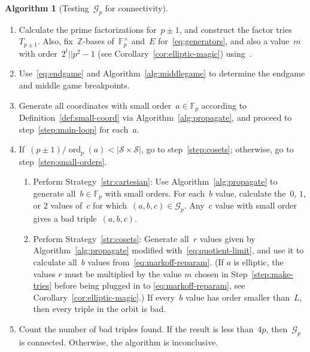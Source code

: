 \documentclass{article}
\DeclareMathOperator{\ord}{ord}
\theoremstyle{definition}
\newtheorem{algorithm-thm}[algocf]{Algorithm}
\theoremstyle{remark}
\begin{document}
\FloatBarrier
\begin{algorithm-thm}[Testing~$\mathcal{G}_p$ for connectivity]\label{alg:process}
    \mbox{}
    \begin{enumerate}[ref=\arabic*]
        \item\label{step:make-tries}
            Calculate the prime factorizations for~$p \pm 1$, and construct the factor tries~$T_{p \pm 1}$.
            Also, fix~$\mathbb{Z}$-bases of~$\mathbb{F}_p^\times$ and~$E$ for~\eqref{eq:generators}, and also a value~$m$ with order~$2^t || p^2 - 1$ (see Corollary~\ref{cor:elliptic-magic}) using~\cite[Algorithm 6.1]{generators}.
        \item\label{step:breakpoints}
            Use~\eqref{eq:endgame} and Algorithm~\ref{alg:middlegame} to determine the endgame and middle game breakpoints.
        \item\label{step:generate-as}
            Generate all coordinates with small order~$a \in \mathbb{F}_p$ according to Definition~\ref{def:small-coord} via Algorithm~\ref{alg:propagate}, and proceed to step~\ref{step:main-loop} for each~$a$.
        \item\label{step:main-loop}
            If~$(p \pm 1) / \ord_p(a) < |\mathcal{S} \times \mathcal{S}|$, go to step~\ref{step:cosets}; otherwise, go to step~\ref{step:small-orders}.
            \begin{enumerate}[ref=\arabic{enumi}(\alph*)]
                \item\label{step:small-orders}
                    Perform Strategy~\ref{str:cartesian}:
                    Use Algorithm~\ref{alg:propagate} to generate all~$b \in \mathbb{F}_p$ with small orders.
                    For each~$b$ value, calculate the~$0$, $1$, or $2$ values of~$c$ for which~$(a, b, c) \in \mathcal{G}_p$.
                    Any~$c$ value with small order gives a bad triple~$(a, b, c)$.
                \item\label{step:cosets}
                    Perform Strategy~\ref{str:cosets}:
                    Generate all~$r$ values given by Algorithm~\ref{alg:propagate} modified with~\eqref{eq:quotient-limit}, and use it to calculate all~$b$ values from~\eqref{eq:markoff-reparam}.
                    (If $a$ is elliptic, the values $r$ must be multiplied by the value $m$ chosen in Step~\ref{step:make-tries} before being plugged in to \eqref{eq:markoff-reparam}, see Corollary~\ref{cor:elliptic-magic}.)
                    If every~$b$ value has order smaller than~$L$, then every triple in the orbit is bad.
            \end{enumerate}
        \item\label{step:total}
            Count the number of bad triples found.
            If the result is less than~$4p$, then~$\mathcal{G}_p$ is connected.
            Otherwise, the algorithm is inconclusive.
    \end{enumerate}
\end{algorithm-thm}%
\end{document}
